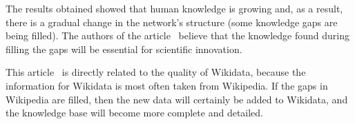 The results obtained showed that human knowledge is growing and, as a result, there is a gradual change in the network's structure (some knowledge gaps are being filled). The authors of the article~ believe that the knowledge found during filling the gaps will be essential for scientific innovation.

This article~ is directly related to the quality of Wikidata, because the information for Wikidata is most often taken from Wikipedia. If the gaps in Wikipedia are filled, then the new data will certainly be added to Wikidata, and the knowledge base will become more complete and detailed.
